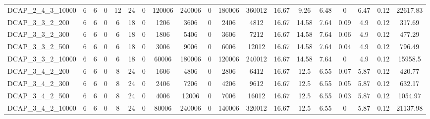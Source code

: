 \begin{table}[H]
{{\begin{tabular}{|l|ccc|ccc|ccccc|cccc|ccc|}
		DCAP\_2\_4\_3\_10000           & 6         & 6        & 0       & 12            & 24           & 0            & 120006 & 240006 & 0   & 180006 & 360012 & 16.67   & 9.26    & 6.48    & 0     & 6.47      & 0.12     & 22617.83     \\
		DCAP\_3\_3\_2\_200             & 6         & 6        & 0       & 6             & 18           & 0            & 1206   & 3606   & 0   & 2406   & 4812   & 16.67   & 14.58   & 7.64    & 0.09  & 4.9       & 0.12     & 317.69       \\
		DCAP\_3\_3\_2\_300             & 6         & 6        & 0       & 6             & 18           & 0            & 1806   & 5406   & 0   & 3606   & 7212   & 16.67   & 14.58   & 7.64    & 0.06  & 4.9       & 0.12     & 477.29       \\
		DCAP\_3\_3\_2\_500             & 6         & 6        & 0       & 6             & 18           & 0            & 3006   & 9006   & 0   & 6006   & 12012  & 16.67   & 14.58   & 7.64    & 0.04  & 4.9       & 0.12     & 796.49       \\
		DCAP\_3\_3\_2\_10000           & 6         & 6        & 0       & 6             & 18           & 0            & 60006  & 180006 & 0   & 120006 & 240012 & 16.67   & 14.58   & 7.64    & 0     & 4.9       & 0.12     & 15958.5      \\
		DCAP\_3\_4\_2\_200             & 6         & 6        & 0       & 8             & 24           & 0            & 1606   & 4806   & 0   & 2806   & 6412   & 16.67   & 12.5    & 6.55    & 0.07  & 5.87      & 0.12     & 420.77       \\
		DCAP\_3\_4\_2\_300             & 6         & 6        & 0       & 8             & 24           & 0            & 2406   & 7206   & 0   & 4206   & 9612   & 16.67   & 12.5    & 6.55    & 0.05  & 5.87      & 0.12     & 632.17       \\
		DCAP\_3\_4\_2\_500             & 6         & 6        & 0       & 8             & 24           & 0            & 4006   & 12006  & 0   & 7006   & 16012  & 16.67   & 12.5    & 6.55    & 0.03  & 5.87      & 0.12     & 1054.97      \\
		DCAP\_3\_4\_2\_10000           & 6         & 6        & 0       & 8             & 24           & 0            & 80006  & 240006 & 0   & 140006 & 320012 & 16.67   & 12.5    & 6.55    & 0     & 5.87      & 0.12     & 21137.98     \\ \hline
	\end{tabular}
	}
	}
\end{table}

